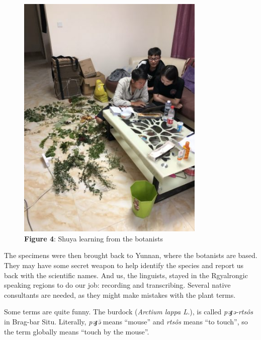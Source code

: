 \documentclass[
  a4paper,
  14pt,
  oneside,
  tablecaptionabove
]{scrbook}
\begin{document}
\begin{figure}[h!]
\centering
\includegraphics[width=0.8\textwidth]{images/IMG_9705-375x500.jpg}
\captionsetup{labelformat=empty}
\caption{\textbf{Figure 4}: Shuya learning from the botanists}
\end{figure}


The specimens were then brought back to Yunnan, where the botanists are
based. They may have some secret weapon to help identify the species and
report us back with the scientific names. And us, the linguists, stayed
in the Rgyalrongic speaking regions to do our job: recording and
transcribing. Several native consultants are needed, as they might make
mistakes with the plant terms.

Some terms are quite funny. The burdock (\emph{Arctium lappa L.}), is
called \emph{pəɟə-rtsôs} in Brag-bar Situ. Literally, \emph{pəɟə̄} means
\enquote{mouse} and \emph{rtsôs} means \enquote{to touch}, so the term
globally means \enquote{touch by the mouse}.
\end{document}
